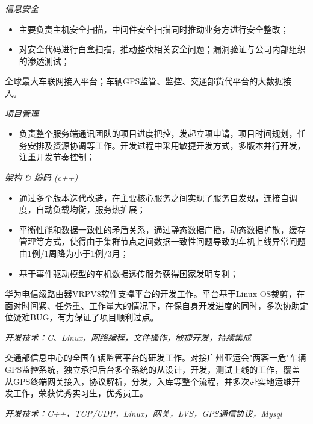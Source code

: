 \textit{信息安全}
\begin{itemize}
    \item 主要负责主机安全扫描，中间件安全扫描同时推动业务方进行安全整改；
    \item 对安全代码进行白盒扫描，推动整改相关安全问题；漏洞验证与公司内部组织的渗透测试；
\end{itemize}

\vspace{0.2cm}
全球最大车联网接入平台；车辆GPS监管、监控、交通部货代平台的大数据接入。

\vspace{0.2cm}
\textit{项目管理}
\begin{itemize}
    \item 负责整个服务端通讯团队的项目进度把控，发起立项申请，项目时间规划，任务安排及资源协调等工作。开发过程中采用敏捷开发方式，多版本并行开发，注重开发节奏控制；
\end{itemize}

\textit{架构 \& 编码 (c++)}
\begin{itemize}
    \item 通过多个版本迭代改造，在主要核心服务之间实现了服务自发现，连接自调度，自动负载均衡，服务热扩展；
    \item 平衡性能和数据一致性的矛盾关系，通过静态数据广播，动态数据扩散，缓存管理等方式，使得由于集群节点之间数据一致性问题导致的车机上线异常问题由1例/1周降为小于1例/3月；
    \item 基于事件驱动模型的车机数据透传服务获得国家发明专利；
\end{itemize}

\vspace{0.2cm}
华为电信级路由器VRPV8软件支撑平台的开发工作。平台基于Linux OS裁剪，在面对时间紧、任务重、工作量大的情况下，在保自身开发进度的同时，多次协助定位疑难BUG，有力保证了项目顺利过点。

\vspace{0.2cm}
\textit{开发技术：C、Linux，网络编程，文件操作，敏捷开发，持续集成}

\vspace{0.2cm}
交通部信息中心的全国车辆监管平台的研发工作。对接广州亚运会"两客一危"车辆GPS监控系统，独立承担后台多个系统的从设计，开发，测试上线的工作，覆盖从GPS终端网关接入，协议解析，分发，入库等整个流程，并多次赴实地运维开发工作，荣获优秀实习生，优秀员工。

\vspace{0.2cm}
\textit{开发技术：C++，TCP/UDP，Linux，网关，LVS，GPS通信协议，Mysql}
